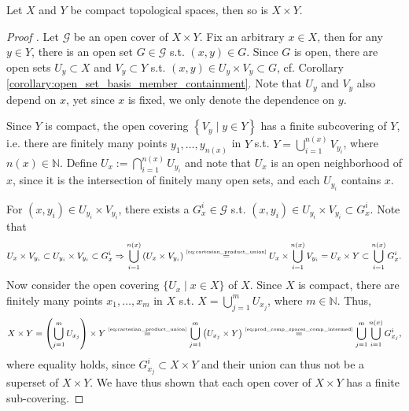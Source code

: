 \begin{theorem}
	Let $X$ and $Y$ be compact topological spaces, then so is $X\times Y$.
\end{theorem}

\begin{proof}[Proof \cite{topology-singh}]
	Let $\mathscr G$ be an open cover of $X\times Y$. Fix an arbitrary $x\in X$, then for any $y\in Y$, there is an open set $G\in \mathscr G$ s.t. $(x, y)\in G$. Since $G$ is open, there are open sets $U_y\subset X$ and $V_y\subset Y$ s.t. $(x, y)\in U_y\times V_y\subset G$, cf. Corollary \ref{corollary:open_set_basis_member_containment}. Note that $U_y$ and $V_y$ also depend on $x$, yet since $x$ is fixed, we only denote the dependence on $y$.
	
	Since $Y$ is compact, the open covering $\left\{V_y\mid y\in Y\right\}$ has a finite subcovering of $Y$, i.e. there are finitely many points $y_1, \dots, y_{n(x)}$ in $Y$ s.t. $Y = \bigcup_{i=1}^{n(x)}V_{y_i}$, where $n(x)\in\mathbb N$. Define $U_x := \bigcap_{i=1}^{n(x)}U_{y_i}$ and note that $U_x$ is an open neighborhood of $x$, since it is the intersection of finitely many open sets, and each $U_{y_i}$ contains $x$. 
	
	For $(x, y_i)\in U_{y_i}\times V_{y_i}$, there exists a $G_{x}^{i}\in \mathscr G$ s.t. $(x, y_i)\in U_{y_i}\times V_{y_i}\subset G_{x}^{i}$. Note that 
	\begin{align}\label{eq:prod_comp_spaces_comp_intermed}
		U_x\times V_{y_i} \subset U_{y_i}\times V_{y_i}\subset G_{x}^{i}\Rightarrow \bigcup_{i=1}^{n(x)}\left(U_{x}\times V_{y_i}\right) \overset{\tiny\eqref{eq:cartesian_product_union}}{=} U_{x}\times \bigcup_{i=1}^{n(x)}V_{y_i} = U_{x}\times Y\subset \bigcup_{i=1}^{n(x)}G_x^i.
	\end{align}
	Now consider the open covering $\{U_x\mid x\in X\}$ of $X$. Since $X$ is compact, there are finitely many points $x_1, \dots, x_m$ in $X$ s.t. $X = \bigcup_{j=1}^{m}U_{x_j}$, where $m\in\mathbb N$. Thus,
	$$X\times Y = \left(\bigcup_{j=1}^{m}U_{x_j}\right)\times Y \overset{\tiny\eqref{eq:cartesian_product_union}}{=} \bigcup_{j=1}^{m}\left(U_{x_j}\times Y\right)\overset{\tiny\eqref{eq:prod_comp_spaces_comp_intermed}}{=} \bigcup_{j=1}^{m}\bigcup_{i=1}^{n(x)}G_{x_j}^{i},$$ where equality holds, since $G_{x_j}^{i}\subset X\times Y$ and their union can thus not be a superset of $X\times Y$. We have thus shown that each open cover of $X\times Y$ has a finite sub-covering.
\end{proof}

